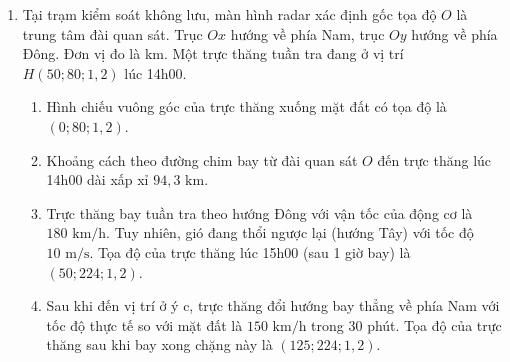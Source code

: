 \documentclass[12pt]{article}
\begin{document}
\begin{enumerate}[label=\textbf{Câu \arabic*:}, leftmargin=*]
\begin{figure}[H]
		\end{figure}
		
		\begin{enumerate}[label=\alph*)]
			\item Lúc 08h00, UAV đang ở độ cao $500\text{ m}$ so với mặt đất.
			\item Tọa độ của UAV lúc 08h00 là $(40; 120; 0,5)$.
			\item UAV được lập trình bay tự động về hướng Bắc (ngược chiều trục chỉ hướng Nam) với vận tốc $60\text{ km/h}$, độ cao không đổi. Tại khu vực đó có gió thổi về hướng Đông với vận tốc $5\text{ m/s}$ (tương đương $18\text{ km/h}$). Nếu vận tốc thực là tổng hợp của vận tốc UAV và sức gió thì lúc 08h30 tọa độ của UAV là $(10; 129; 0,5)$.
			\item Vận tốc thực tế của UAV so với mặt đất xấp xỉ $62,64\text{ km/h}$.
		\end{enumerate}
		
		\vspace{3mm}
		\item Tại trạm kiểm soát không lưu, màn hình radar xác định gốc tọa độ $O$ là trung tâm đài quan sát. Trục $Ox$ hướng về phía Nam, trục $Oy$ hướng về phía Đông. Đơn vị đo là km. Một trực thăng tuần tra đang ở vị trí $H(50; 80; 1,2)$ lúc 14h00.
		\begin{enumerate}[label=\alph*)]
			\item Hình chiếu vuông góc của trực thăng xuống mặt đất có tọa độ là $(0; 80; 1,2)$.
			\item Khoảng cách theo đường chim bay từ đài quan sát $O$ đến trực thăng lúc 14h00 dài xấp xỉ $94,3\text{ km}$.
			\item Trực thăng bay tuần tra theo hướng Đông với vận tốc của động cơ là $180\text{ km/h}$. Tuy nhiên, gió đang thổi ngược lại (hướng Tây) với tốc độ $10\text{ m/s}$. Tọa độ của trực thăng lúc 15h00 (sau 1 giờ bay) là $(50; 224; 1,2)$.
			\item Sau khi đến vị trí ở ý c, trực thăng đổi hướng bay thẳng về phía Nam với tốc độ thực tế so với mặt đất là $150\text{ km/h}$ trong $30$ phút. Tọa độ của trực thăng sau khi bay xong chặng này là $(125; 224; 1,2)$.
		\end{enumerate}
		

\end{enumerate}
\end{document}
